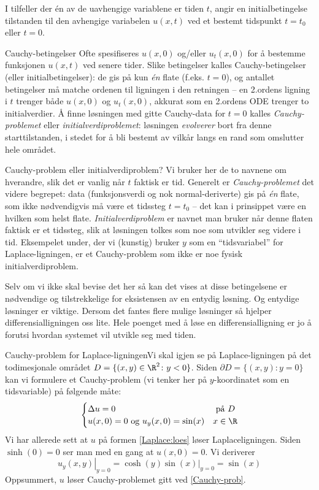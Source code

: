 I tilfeller der én av de uavhengige variablene er tiden \( t \), angir en initialbetingelse tilstanden til den avhengige variabelen \( u(x, t) \) ved et bestemt tidspunkt \( t = t_0 \) eller \( t = 0 \).
\begin{defn}{Cauchy-betingelser}
Ofte spesifiseres \( u(x, 0) \) og/eller \( u_t(x, 0) \) for å bestemme funksjonen \( u(x, t) \) ved senere tider. Slike betingelser kalles Cauchy-betingelser (eller initialbetingelser): de gis på kun \emph{én} flate (f.eks. $t=0$), og antallet betingelser må matche ordenen til ligningen i den retningen -- en 2.ordens ligning i $t$ trenger både $u(x,0)$ og $u_t(x,0)$, akkurat som en 2.ordens ODE trenger to initialverdier. Å finne løsningen med gitte Cauchy-data for $t=0$ kalles \emph{Cauchy-problemet} eller \emph{initialverdiproblemet}: løsningen \emph{evolverer} bort fra denne starttilstanden, i stedet for å bli bestemt av vilkår langs en rand som omslutter hele området.
\end{defn}

\begin{rem}{Cauchy-problem eller initialverdiproblem?}
Vi bruker her de to navnene om hverandre, slik det er vanlig når $t$ faktisk er tid. Generelt er \emph{Cauchy-problemet} det videre begrepet: data (funksjonsverdi og nok normal-deriverte) gis på \emph{én} flate, som ikke nødvendigvis må være et tidssteg $t=t_0$ -- det kan i prinsippet være en hvilken som helst flate. \emph{Initialverdiproblem} er navnet man bruker når denne flaten faktisk er et tidssteg, slik at løsningen tolkes som noe som utvikler seg videre i tid. Eksempelet under, der vi (kunstig) bruker $y$ som en ``tidsvariabel'' for Laplace-ligningen, er et Cauchy-problem som ikke er noe fysisk initialverdiproblem.
\end{rem}
Selv om vi ikke skal bevise det her så kan det vises at disse betingelsene er nødvendige og tilstrekkelige for eksistensen av en entydig løsning. Og entydige løsninger er viktige. Dersom det fantes flere mulige løsninger så hjelper differensialligningen oss lite. Hele poenget med å løse en differensialligning er jo å forutsi hvordan systemet vil utvikle seg med tiden.

\begin{eks}{Cauchy-problem for Laplace-ligningen}Vi skal igjen se på Laplace-ligningen på det todimesjonale  området $D=\{(x,y) \in \R^2\colon y <0\}$. Siden $\partial D =\{(x,y) \colon y=0\}$ kan vi formulere et Cauchy-problem (vi tenker her på $y$-koordinatet som en tidsvariable) på følgende måte:
\begin{equation}\label{Cauchy-prob}
\begin{cases}
\Delta u = 0 & \text{ på } D\\
u(x,0)=0 \text{ og } u_y(x,0)=\sin (x) & x \in \R
\end{cases}
\end{equation}
Vi har allerede sett at $u$ på formen \eqref{Laplace:loes} løser Laplaceligningen. Siden $\sinh(0)=0$ ser man med en gang at $u(x,0)=0$.
Vi deriverer \[\left.u_y(x,y)\right|_{y=0}=\left.\cosh(y)\sin(x)\right|_{y=0} = \sin(x)\]
Oppsummert, $u$ løser Cauchy-problemet gitt ved \eqref{Cauchy-prob}.
\end{eks}

